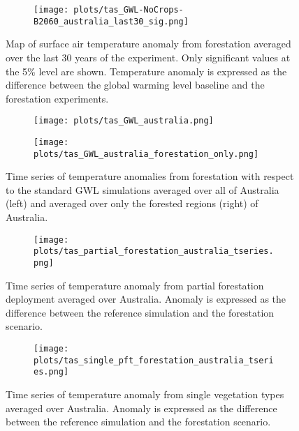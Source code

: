 \documentclass[]{article}
\begin{document}
\begin{figure}[H]
    \centering
    \begin{subfigure}[b]{\linewidth}
        \texttt{[image: plots/tas\_GWL-NoCrops-B2060\_australia\_last30\_sig.png]}
    \end{subfigure}
    \caption{Map of surface air temperature anomaly from forestation averaged over the last 30 years of the experiment. Only significant values at the 5\% level are shown. Temperature anomaly is expressed as the difference between the global warming level baseline and the forestation experiments.}
    \label{fig:tas_australia_map}
\end{figure}

\begin{figure}[H]
    \centering
    \begin{subfigure}[b]{0.4\linewidth}
        \texttt{[image: plots/tas\_GWL\_australia.png]}
    \end{subfigure}
    \begin{subfigure}[b]{0.4\linewidth}
        \texttt{[image: plots/tas\_GWL\_australia\_forestation\_only.png]}
    \end{subfigure}
    \caption{Time series of temperature anomalies from forestation with respect to the standard GWL simulations averaged over all of Australia (left) and averaged over only the forested regions (right) of Australia.}
    \label{fig:tas_australia_timeseries}
\end{figure}

\begin{figure}[H]
    \centering
    \begin{subfigure}[b]{\linewidth}
        \texttt{[image: plots/tas\_partial\_forestation\_australia\_tseries.png]}
    \end{subfigure}
    \caption{Time series of temperature anomaly from partial forestation deployment averaged over Australia. Anomaly is expressed as the difference between the reference simulation and the forestation scenario.}
    \label{fig:tas_australia_partial}
\end{figure}

\begin{figure}[H]
    \centering
    \begin{subfigure}[b]{\linewidth}
        \texttt{[image: plots/tas\_single\_pft\_forestation\_australia\_tseries.png]}
    \end{subfigure}
    \caption{Time series of temperature anomaly from single vegetation types averaged over Australia. Anomaly is expressed as the difference between the reference simulation and the forestation scenario.}
    \label{fig:tas_australia_single}
\end{figure}
\end{document}

